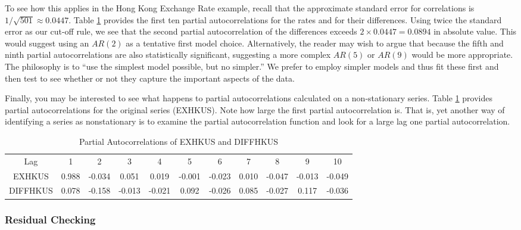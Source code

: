 To see how this applies in the Hong Kong Exchange Rate example,
recall that the approximate standard error for correlations is
$1/\sqrt{501}\approx 0.0447$. Table \ref{T8:PartialAuto} provides
the first ten partial autocorrelations for the rates and for their
differences. Using twice the standard error as our cut-off rule, we
see that the second partial autocorrelation of the differences
exceeds $2\times 0.0447=0.0894$ in absolute value. This would
suggest using an $AR(2)$ as a tentative first model choice.
Alternatively, the reader may wish to argue that because the fifth
and ninth partial autocorrelations are also statistically
significant, suggesting a more complex $AR(5)$ or $AR(9)$ would be
more appropriate. The philosophy is to ``use the simplest model
possible, but no simpler.'' We prefer to employ simpler models and
thus fit these first and then test to see whether or not they
capture the important aspects of the data.


Finally, you may be interested to see what happens to partial
autocorrelations calculated on a non-stationary series. Table
\ref{T8:PartialAuto} provides partial autocorrelations for the
original series (EXHKUS). Note how large the first partial
autocorrelation is. That is, yet another way of identifying a series
as nonstationary is to examine the partial autocorrelation function
and look for a large lag one partial autocorrelation.


\begin{table}[h]
 \caption{\label{T8:PartialAuto} Partial
Autocorrelations of EXHKUS and DIFFHKUS}
\begin{tabular}{c|cccccccccc}
\hline
Lag & 1 & 2 & 3 & 4 & 5 & 6 & 7 & 8 & 9 & 10 \\
EXHKUS & 0.988 & -0.034 & 0.051 & 0.019 & -0.001 & -0.023 & 0.010 &
-0.047 &
-0.013 & -0.049 \\
DIFFHKUS & 0.078 & -0.158 & -0.013 & -0.021 & 0.092 & -0.026 & 0.085
& -0.027 & 0.117 & -0.036 \\ \hline
\end{tabular}
\end{table}


\subsubsection*{Residual Checking}

